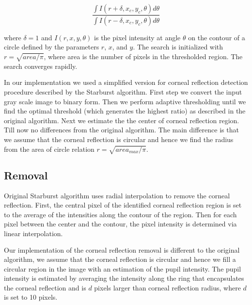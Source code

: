 \begin{dBox}
	\begin{equation}
		\frac{ \int I ( r + \delta, x_{c}, y_{c}, \theta ) d\theta }{ \int I ( r - \delta, x_{c}, y_{c}, \theta ) d\theta}
	\end{equation}
\end{dBox}

where $\delta = 1$ and $I(r, x, y, \theta)$ is the pixel intensity at angle $\theta$ on the contour of a circle defined by the parameters $r$, $x$, and $y$. The search is initialized with $r = \sqrt{area/\pi}$, where area is the number of pixels in the thresholded region. The search converges rapidly.\bigskip

\begin{our}
In our implementation we used a simplified version for corneal reflection detection procedure described by the Starburst algorithm. First step we convert the input gray scale image to binary form. Then we perform adaptive thresholding until we find the optimal threshold (which generates the highest ratio) as described in the original algorithm. Next we estimate the the center of corneal reflection region. Till now no differences from the original algorithm. The main difference is that we assume that the corneal reflection is circular and hence we find the radius from the area of circle relation $r = \sqrt{ area_{max} / \pi }$.
\end{our}

\subsection{Removal}
Original Starburst algorithm uses radial interpolation to remove the corneal reflection. First, the central pixel of the identified corneal reflection region is set to the average of the intensities along the contour of the region. Then for each pixel between the center and the contour, the pixel intensity is determined via linear interpolation. \bigskip

\begin{our}
Our implementation of the corneal reflection removal is different to the original algorithm, we assume that the corneal reflection is circular and hence we fill a circular region in the image with an estimation of the pupil intensity. The pupil intensity is estimated by averaging the intensity along the ring that encapsulates the corneal reflection and is $d$ pixels larger than corneal reflection radius, where $d$ is set to 10 pixels.
\end{our}


